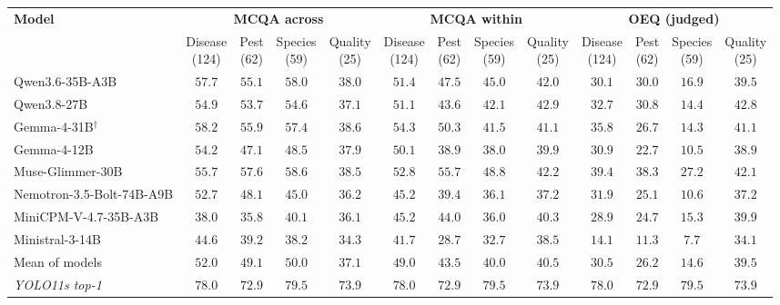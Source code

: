 \setlength{\tabcolsep}{3.5pt}
\begin{tabular}{lcccccccccccc}
\toprule
\multirow{2}{*}{\textbf{Model}} & \multicolumn{4}{c}{\textbf{MCQA across}} & \multicolumn{4}{c}{\textbf{MCQA within}} & \multicolumn{4}{c}{\textbf{OEQ (judged)}} \\
\cmidrule(lr){2-5} \cmidrule(lr){6-9} \cmidrule(lr){10-13}
 & \makecell{Disease\\(124)} & \makecell{Pest\\(62)} & \makecell{Species\\(59)} & \makecell{Quality\\(25)} & \makecell{Disease\\(124)} & \makecell{Pest\\(62)} & \makecell{Species\\(59)} & \makecell{Quality\\(25)} & \makecell{Disease\\(124)} & \makecell{Pest\\(62)} & \makecell{Species\\(59)} & \makecell{Quality\\(25)} \\
\midrule
Qwen3.6-35B-A3B & $57.7$ & $55.1$ & $58.0$ & $38.0$ & $51.4$ & $47.5$ & $45.0$ & $42.0$ & $30.1$ & $30.0$ & $16.9$ & $39.5$ \\
Qwen3.8-27B & $54.9$ & $53.7$ & $54.6$ & $37.1$ & $51.1$ & $43.6$ & $42.1$ & $\mathbf{42.9}$ & $32.7$ & $30.8$ & $14.4$ & $\mathbf{42.8}$ \\
Gemma-4-31B$^\dagger$ & $\mathbf{58.2}$ & $55.9$ & $57.4$ & $\mathbf{38.6}$ & $\mathbf{54.3}$ & $50.3$ & $41.5$ & $41.1$ & $35.8$ & $26.7$ & $14.3$ & $41.1$ \\
Gemma-4-12B & $54.2$ & $47.1$ & $48.5$ & $37.9$ & $50.1$ & $38.9$ & $38.0$ & $39.9$ & $30.9$ & $22.7$ & $10.5$ & $38.9$ \\
Muse-Glimmer-30B & $55.7$ & $\mathbf{57.6}$ & $\mathbf{58.6}$ & $38.5$ & $52.8$ & $\mathbf{55.7}$ & $\mathbf{48.8}$ & $42.2$ & $\mathbf{39.4}$ & $\mathbf{38.3}$ & $\mathbf{27.2}$ & $42.1$ \\
Nemotron-3.5-Bolt-74B-A9B & $52.7$ & $48.1$ & $45.0$ & $36.2$ & $45.2$ & $39.4$ & $36.1$ & $37.2$ & $31.9$ & $25.1$ & $10.6$ & $37.2$ \\
MiniCPM-V-4.7-35B-A3B & $38.0$ & $35.8$ & $40.1$ & $36.1$ & $45.2$ & $44.0$ & $36.0$ & $40.3$ & $28.9$ & $24.7$ & $15.3$ & $39.9$ \\
Ministral-3-14B & $44.6$ & $39.2$ & $38.2$ & $34.3$ & $41.7$ & $28.7$ & $32.7$ & $38.5$ & $14.1$ & $11.3$ & $7.7$ & $34.1$ \\
\midrule
Mean of models & $52.0$ & $49.1$ & $50.0$ & $37.1$ & $49.0$ & $43.5$ & $40.0$ & $40.5$ & $30.5$ & $26.2$ & $14.6$ & $39.5$ \\
\textit{YOLO11s top-1} & $78.0$ & $72.9$ & $79.5$ & $73.9$ & $78.0$ & $72.9$ & $79.5$ & $73.9$ & $78.0$ & $72.9$ & $79.5$ & $73.9$ \\
\bottomrule
\end{tabular}

